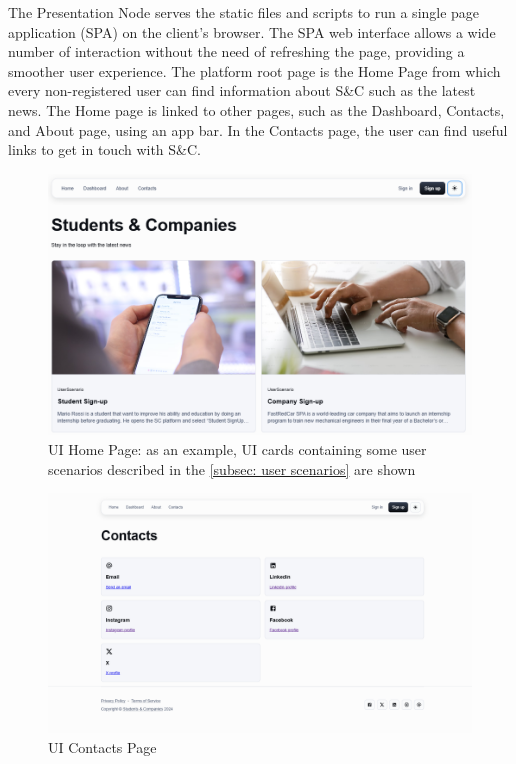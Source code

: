 The Presentation Node serves the static files and scripts to run a single page application (SPA) on the client's browser.
The SPA web interface allows a wide number of interaction without the need of refreshing the page, providing a smoother user experience. The platform root page is the Home Page from which every non-registered user can find information about S\&C such as the latest news. The Home page is linked to other pages, such as the Dashboard, Contacts, and About page, using an app bar. 
In the Contacts page, the user can find useful links to get in touch with S\&C.\\
\begin{figure}[H]
    \centering
    \includegraphics[width=\textwidth]{Latex/Images/HomePage.png}
    \caption{UI Home Page: as an example, UI cards containing some user scenarios described in the \ref{subsec: user scenarios}  are shown}
    \label{fig:homepage}
\end{figure}
\begin{figure}[H]
    \centering
    \includegraphics[width=\textwidth]{Latex/Images/New Ui/Contacts.png}
    \caption{UI Contacts Page}
    \label{fig:contactpage}
\end{figure}
